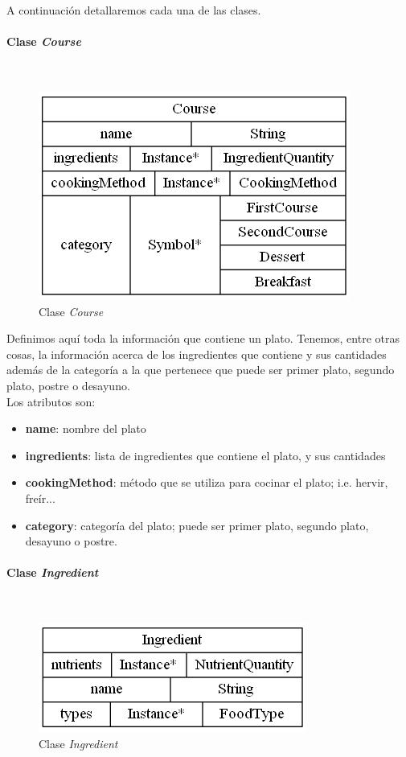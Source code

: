 \documentclass[11]{article}
\begin{document}
\vspace{0.5cm}

A continuación detallaremos cada una de las clases.

\paragraph{Clase \emph{Course}}\mbox{}\\
\begin{figure}[H]
\centering
\includegraphics[scale=0.5]{images/class_Course.png}
\caption{Clase \emph{Course}}
\label{fig_class_Course}
\end{figure}

Definimos aquí toda la información que contiene un plato. Tenemos, entre otras cosas, la información acerca de los ingredientes que contiene y sus cantidades además de la categoría a la que pertenece que puede ser primer plato, segundo plato, postre o desayuno.
\\

Los atributos son:
\begin{itemize}
\item \textbf{name}: nombre del plato
\item \textbf{ingredients}: lista de ingredientes que contiene el plato, y sus cantidades
\item \textbf{cookingMethod}: método que se utiliza para cocinar el plato; i.e. hervir, freír...
\item \textbf{category}: categoría del plato; puede ser primer plato, segundo plato, desayuno o postre. 
\end{itemize}


\vspace{0.5cm}

\paragraph{Clase \emph{Ingredient}}\mbox{}\\
\begin{figure}[H]
\centering
\includegraphics[scale=0.5]{images/class_Ingredient.png}
\caption{Clase \emph{Ingredient}}
\label{fig_class_Ingredient}
\end{figure}
\end{document}
